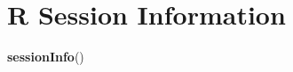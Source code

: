 \documentclass[]{article}
\newenvironment{Shaded}{\begin{snugshade}}{\end{snugshade}}
\newcommand{\CommentTok}[1]{\textcolor[rgb]{0.56,0.35,0.01}{\textit{#1}}}
\newcommand{\KeywordTok}[1]{\textcolor[rgb]{0.13,0.29,0.53}{\textbf{#1}}}
\newcommand{\NormalTok}[1]{#1}
\begin{document}
\begin{Shaded}
\end{Shaded}

\hypertarget{r-session-information}{%
\section{R Session Information}\label{r-session-information}}

\begin{Shaded}
\begin{Highlighting}[]
\KeywordTok{sessionInfo}\NormalTok{()}
\end{Highlighting}
\end{Shaded}
\end{document}
